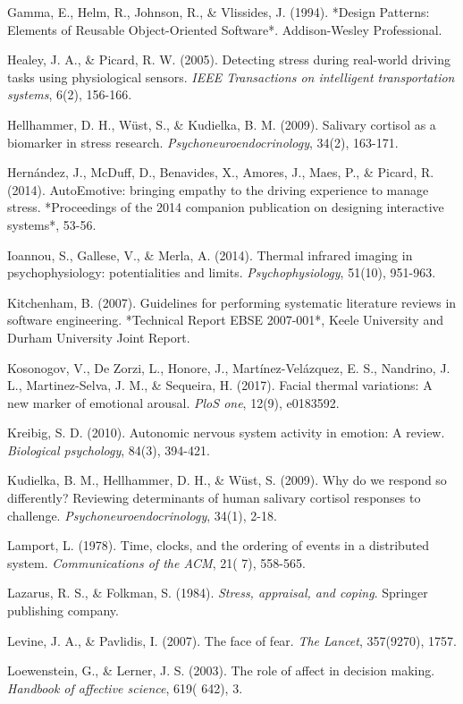 \documentclass[12pt,a4paper]{article}
\begin{document}
Gamma, E., Helm, R., Johnson, R., \& Vlissides, J. (1994). *Design Patterns: Elements of Reusable Object-Oriented
Software*. Addison-Wesley Professional.

Healey, J. A., \& Picard, R. W. (2005). Detecting stress during real-world driving tasks using physiological sensors.
\textit{IEEE Transactions on intelligent transportation systems}, 6(2), 156-166.

Hellhammer, D. H., Wüst, S., \& Kudielka, B. M. (2009). Salivary cortisol as a biomarker in stress research.
\textit{Psychoneuroendocrinology}, 34(2), 163-171.

Hernández, J., McDuff, D., Benavides, X., Amores, J., Maes, P., \& Picard, R. (2014). AutoEmotive: bringing empathy to
the driving experience to manage stress. *Proceedings of the 2014 companion publication on designing interactive
systems*, 53-56.

Ioannou, S., Gallese, V., \& Merla, A. (2014). Thermal infrared imaging in psychophysiology: potentialities and limits.
\textit{Psychophysiology}, 51(10), 951-963.

Kitchenham, B. (2007). Guidelines for performing systematic literature reviews in software engineering. *Technical
Report EBSE 2007-001*, Keele University and Durham University Joint Report.

Kosonogov, V., De Zorzi, L., Honore, J., Martínez-Velázquez, E. S., Nandrino, J. L., Martinez-Selva, J. M., \& Sequeira,
H. (2017). Facial thermal variations: A new marker of emotional arousal. \textit{PloS one}, 12(9), e0183592.

Kreibig, S. D. (2010). Autonomic nervous system activity in emotion: A review. \textit{Biological psychology}, 84(3), 394-421.

Kudielka, B. M., Hellhammer, D. H., \& Wüst, S. (2009). Why do we respond so differently? Reviewing determinants of human
salivary cortisol responses to challenge. \textit{Psychoneuroendocrinology}, 34(1), 2-18.

Lamport, L. (1978). Time, clocks, and the ordering of events in a distributed system. \textit{Communications of the ACM}, 21(
7), 558-565.

Lazarus, R. S., \& Folkman, S. (1984). \textit{Stress, appraisal, and coping}. Springer publishing company.

Levine, J. A., \& Pavlidis, I. (2007). The face of fear. \textit{The Lancet}, 357(9270), 1757.

Loewenstein, G., \& Lerner, J. S. (2003). The role of affect in decision making. \textit{Handbook of affective science}, 619(
642), 3.
\end{document}
